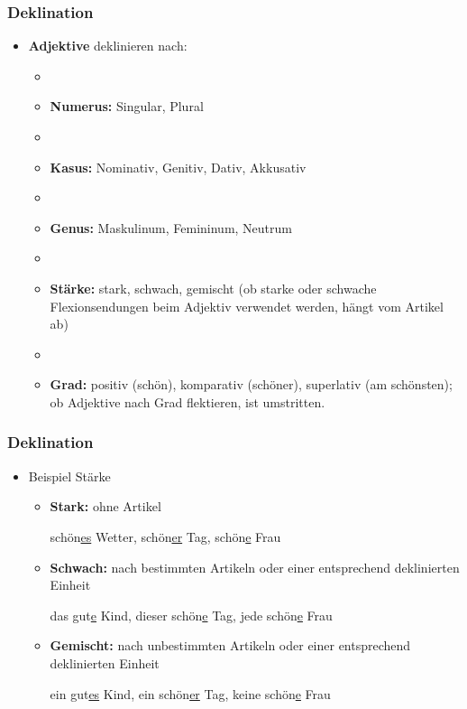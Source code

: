 
\begin{frame}
\frametitle{Deklination}

\begin{itemize}
	\item \textbf{Adjektive} deklinieren nach:
	
	\begin{itemize}
		\item[]
		\item \textbf{Numerus:} Singular, Plural
		\item []
		\item \textbf{Kasus:} Nominativ, Genitiv, Dativ, Akkusativ
		\item[]
		\item \textbf{Genus:} Maskulinum, Femininum, Neutrum
		\item[]
		\item \textbf{Stärke:} stark, schwach, gemischt (ob starke oder schwache Flexionsendungen beim Adjektiv verwendet werden, hängt vom Artikel ab)
		\item[]
		\item \textbf{Grad:} positiv (schön), komparativ (schöner), superlativ (am schönsten); ob Adjektive nach Grad flektieren, ist umstritten.
	\end{itemize}
	
\end{itemize}


\end{frame}




\begin{frame}
\frametitle{Deklination}

\begin{itemize}
	\item Beispiel Stärke
	
	\begin{itemize}
		\item \textbf{Stark:} ohne Artikel
		
		\ea schön\underline{es} Wetter, schön\underline{er} Tag, schön\underline{e} Frau
		\z
		
		\item \textbf{Schwach:} nach bestimmten Artikeln oder einer entsprechend deklinierten Einheit
		
		\ea das gut\underline{e} Kind, dieser schön\underline{e} Tag, jede schön\underline{e} Frau
		\z
		
		\item \textbf{Gemischt:} nach unbestimmten Artikeln oder einer entsprechend deklinierten Einheit
		
		\ea ein gut\underline{es} Kind, ein schön\underline{er} Tag, keine schön\underline{e} Frau
		\z
		
	\end{itemize}
	
\end{itemize}

\end{frame}



